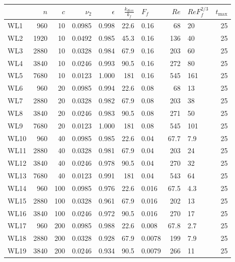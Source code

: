 \begin{tabular}{lrrrrrlrlr}
\toprule
{} &   $n$ &  $c$ &  $\nu_2$ &  $\epsilon$ &  $\frac{k_{diss}}{k_f}$ &   $F_f$ &  $Re$ & $ReF_f^{2/3}$ &  $t_{\max}$ \\
\midrule
WL1  &   960 &   10 &   0.0985 &       0.998 &                    22.6 &    0.16 &    68 &            20 &          25 \\
WL2  &  1920 &   10 &   0.0492 &       0.985 &                    45.3 &    0.16 &   136 &            40 &          25 \\
WL3  &  2880 &   10 &   0.0328 &       0.984 &                    67.9 &    0.16 &   203 &            60 &          25 \\
WL4  &  3840 &   10 &   0.0246 &       0.993 &                    90.5 &    0.16 &   272 &            80 &          25 \\
WL5  &  7680 &   10 &   0.0123 &       1.000 &                     181 &    0.16 &   545 &           161 &          25 \\
WL6  &   960 &   20 &   0.0985 &       0.994 &                    22.6 &    0.08 &    68 &            13 &          25 \\
WL7  &  2880 &   20 &   0.0328 &       0.982 &                    67.9 &    0.08 &   203 &            38 &          25 \\
WL8  &  3840 &   20 &   0.0246 &       0.983 &                    90.5 &    0.08 &   271 &            50 &          25 \\
WL9  &  7680 &   20 &   0.0123 &       1.000 &                     181 &    0.08 &   545 &           101 &          25 \\
WL10 &   960 &   40 &   0.0985 &       0.985 &                    22.6 &    0.04 &  67.7 &           7.9 &          25 \\
WL11 &  2880 &   40 &   0.0328 &       0.981 &                    67.9 &    0.04 &   203 &            24 &          25 \\
WL12 &  3840 &   40 &   0.0246 &       0.978 &                    90.5 &    0.04 &   270 &            32 &          25 \\
WL13 &  7680 &   40 &   0.0123 &       0.991 &                     181 &    0.04 &   543 &            64 &          25 \\
WL14 &   960 &  100 &   0.0985 &       0.976 &                    22.6 &   0.016 &  67.5 &           4.3 &          25 \\
WL15 &  2880 &  100 &   0.0328 &       0.961 &                    67.9 &   0.016 &   202 &            13 &          25 \\
WL16 &  3840 &  100 &   0.0246 &       0.972 &                    90.5 &   0.016 &   270 &            17 &          25 \\
WL17 &   960 &  200 &   0.0985 &       0.988 &                    22.6 &   0.008 &  67.8 &           2.7 &          25 \\
WL18 &  2880 &  200 &   0.0328 &       0.928 &                    67.9 &  0.0078 &   199 &           7.9 &          25 \\
WL19 &  3840 &  200 &   0.0246 &       0.934 &                    90.5 &  0.0079 &   266 &            11 &          25 \\
\bottomrule
\end{tabular}
